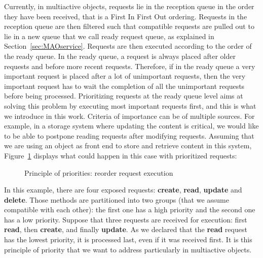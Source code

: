 \documentclass[11pt]{report}
\begin{document}
Currently, in multiactive objects, requests lie in the reception queue in the order they have been received, that is a First In First Out ordering. Requests in the reception queue are then filtered such that compatible requests are pulled out to lie in a new queue that we call ready request queue, as explained in Section~\ref{sec:MAOservice}. Requests are then executed according to the order of the ready queue. In the ready queue, a request is always placed after older requests and before more recent requests. Therefore, if in the ready queue a very important request is placed after a lot of unimportant requests, then the very important request has to wait the completion of all the unimportant requests before being processed. Prioritizing requests at the ready queue level aims at solving this problem by executing most important requests first, and this is what we introduce in this work. Criteria of importance can be of multiple sources. For example, in a storage system where updating the content is critical, we would like to be able to postpone reading requests after modifying requests. Assuming that we are using an object as front end to store and retrieve content in this system, Figure~\ref{fig:priority_principle} displays what could happen in this case with prioritized requests:

\begin{figure}[ht]
      \caption{Principle of priorities: reorder request execution}
      \label{fig:priority_principle}
\end{figure}

In this example, there are four exposed requests: \textbf{create}, \textbf{read}, \textbf{update} and \textbf{delete}. Those methods are partitioned into two groups (that we assume compatible with each other): the first one has a high priority and the second one has a low priority. Suppose that three requests are received for execution: first \textbf{read}, then \textbf{create}, and finally \textbf{update}. As we declared that the \textbf{read} request has the lowest priority, it is processed last, even if it was received first. It is this principle of priority that we want to address particularly in multiactive objects.
\end{document}
